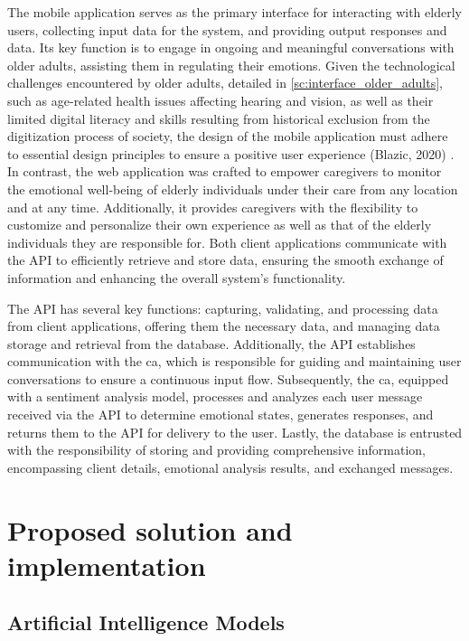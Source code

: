 \documentclass[a4paper,fleqn]{cas-sc}
\begin{document}
The mobile application serves as the primary interface for interacting with elderly users, collecting input data for the system, and providing output responses and data. Its key function is to engage in ongoing and meaningful conversations with older adults, assisting them in regulating their emotions. Given the technological challenges encountered by older adults, detailed in \autoref{sc:interface_older_adults}, such as age-related health issues affecting hearing and vision, as well as their limited digital literacy and skills resulting from historical exclusion from the digitization process of society, the design of the mobile application must adhere to essential design principles to ensure a positive user experience (Blazic, 2020) \cite{blazic_overcoming_2020}. In contrast, the web application was crafted to empower caregivers to monitor the emotional well-being of elderly individuals under their care from any location and at any time. Additionally, it provides caregivers with the flexibility to customize and personalize their own experience as well as that of the elderly individuals they are responsible for. Both client applications communicate with the API to efficiently retrieve and store data, ensuring the smooth exchange of information and enhancing the overall system's functionality.

The API has several key functions: capturing, validating, and processing data from client applications, offering them the necessary data, and managing data storage and retrieval from the database. Additionally, the API establishes communication with the \gls{ca}, which is responsible for guiding and maintaining user conversations to ensure a continuous input flow. Subsequently, the \gls{ca}, equipped with a sentiment analysis model, processes and analyzes each user message received via the API to determine emotional states, generates responses, and returns them to the API for delivery to the user. Lastly, the database is entrusted with the responsibility of storing and providing comprehensive information, encompassing client details, emotional analysis results, and exchanged messages.
 
\section{Proposed solution and implementation}
\label{proposedSolution}



\subsection{Artificial Intelligence Models}
\end{document}
